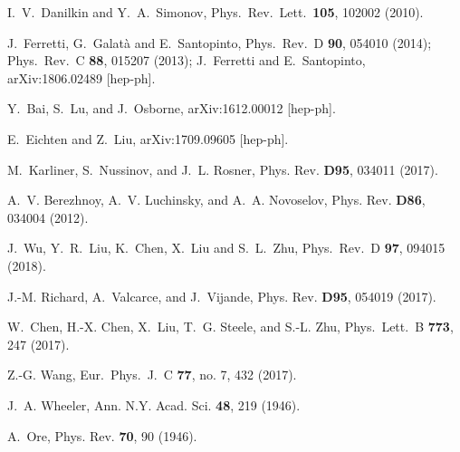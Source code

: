 \documentclass[twocolumn,showpacs,superscriptaddress,preprintnumbers,nofootinbib,prd]{revtex4-1}
\begin{document}
\begin{thebibliography}{}
  I.~V.~Danilkin and Y.~A.~Simonov,
  Phys.\ Rev.\ Lett.\  {\bf 105}, 102002 (2010).

  J.~Ferretti, G.~Galat\`a and E.~Santopinto,
  Phys.\ Rev.\ D {\bf 90}, 054010 (2014);
  Phys.\ Rev.\ C {\bf 88}, 015207 (2013);
  J.~Ferretti and E.~Santopinto,
  arXiv:1806.02489 [hep-ph].

  Y.~Bai, S.~Lu, and J.~Osborne,
  arXiv:1612.00012 [hep-ph].  		

  E.~Eichten and Z.~Liu,
  arXiv:1709.09605 [hep-ph].

M.~Karliner, S.~Nussinov, and J.~L. Rosner, %
Phys. Rev. {\bf D95}, 034011 (2017).

A.~V. Berezhnoy, A.~V. Luchinsky, and A.~A. Novoselov, %
Phys. Rev. {\bf D86}, 034004 (2012).

J.~Wu, Y.~R.~Liu, K.~Chen, X.~Liu and S.~L.~Zhu,
  Phys.\ Rev.\ D {\bf 97}, 094015 (2018).

J.-M. Richard, A.~Valcarce, and J.~Vijande, %
Phys. Rev. {\bf D95}, 054019 (2017).

W.~Chen, H.-X. Chen, X.~Liu, T.~G. Steele, and S.-L. Zhu,
Phys.\ Lett.\ B {\bf 773}, 247 (2017).

Z.-G. Wang, %
Eur.\ Phys.\ J.\ C {\bf 77}, no. 7, 432 (2017).

J.~A. Wheeler, %
Ann. N.Y. Acad. Sci. {\bf 48}, 219 (1946).

A.~Ore,
Phys. Rev. {\bf 70}, 90 (1946).


\end{thebibliography}
\end{document}
